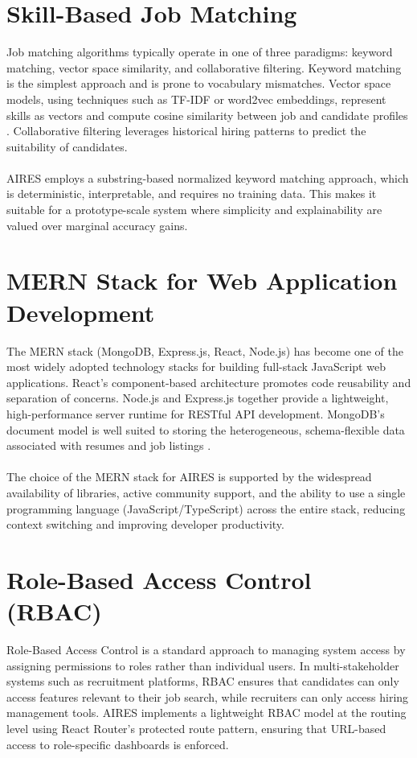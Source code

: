 \section{Skill-Based Job Matching}
Job matching algorithms typically operate in one of three paradigms: keyword matching, vector space similarity, and collaborative filtering. Keyword matching is the simplest approach and is prone to vocabulary mismatches. Vector space models, using techniques such as TF-IDF or word2vec embeddings, represent skills as vectors and compute cosine similarity between job and candidate profiles \cite{Schmitt2016}. Collaborative filtering leverages historical hiring patterns to predict the suitability of candidates.\\\\
AIRES employs a substring-based normalized keyword matching approach, which is deterministic, interpretable, and requires no training data. This makes it suitable for a prototype-scale system where simplicity and explainability are valued over marginal accuracy gains.

\section{MERN Stack for Web Application Development}
The MERN stack (MongoDB, Express.js, React, Node.js) has become one of the most widely adopted technology stacks for building full-stack JavaScript web applications. React's component-based architecture promotes code reusability and separation of concerns. Node.js and Express.js together provide a lightweight, high-performance server runtime for RESTful API development. MongoDB's document model is well suited to storing the heterogeneous, schema-flexible data associated with resumes and job listings \cite{Tilkov2010}.\\\\
The choice of the MERN stack for AIRES is supported by the widespread availability of libraries, active community support, and the ability to use a single programming language (JavaScript/TypeScript) across the entire stack, reducing context switching and improving developer productivity.

\section{Role-Based Access Control (RBAC)}
Role-Based Access Control is a standard approach to managing system access by assigning permissions to roles rather than individual users. In multi-stakeholder systems such as recruitment platforms, RBAC ensures that candidates can only access features relevant to their job search, while recruiters can only access hiring management tools. AIRES implements a lightweight RBAC model at the routing level using React Router's protected route pattern, ensuring that URL-based access to role-specific dashboards is enforced.

